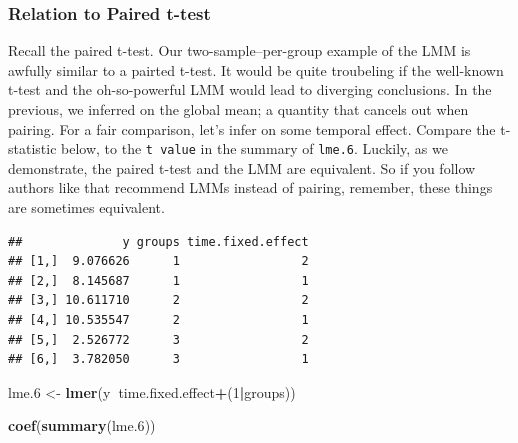 \documentclass[]{book}
\newenvironment{Shaded}{\begin{snugshade}}{\end{snugshade}}
\newcommand{\DataTypeTok}[1]{\textcolor[rgb]{0.13,0.29,0.53}{#1}}
\newcommand{\DecValTok}[1]{\textcolor[rgb]{0.00,0.00,0.81}{#1}}
\newcommand{\FloatTok}[1]{\textcolor[rgb]{0.00,0.00,0.81}{#1}}
\newcommand{\KeywordTok}[1]{\textcolor[rgb]{0.13,0.29,0.53}{\textbf{#1}}}
\newcommand{\NormalTok}[1]{#1}
\newcommand{\OperatorTok}[1]{\textcolor[rgb]{0.81,0.36,0.00}{\textbf{#1}}}
\newcommand{\StringTok}[1]{\textcolor[rgb]{0.31,0.60,0.02}{#1}}
\theoremstyle{definition}
\theoremstyle{definition}
\theoremstyle{definition}
\theoremstyle{remark}
\begin{document}
\hypertarget{relation-to-paired-t-test}{%
\subsubsection{Relation to Paired t-test}\label{relation-to-paired-t-test}}

Recall the paired t-test.
Our two-sample--per-group example of the LMM is awfully similar to a pairted t-test.
It would be quite troubeling if the well-known t-test and the oh-so-powerful LMM would lead to diverging conclusions.
In the previous, we inferred on the global mean; a quantity that cancels out when pairing. For a fair comparison, let's infer on some temporal effect.
Compare the t-statistic below, to the \texttt{t\ value} in the summary of \texttt{lme.6}.
Luckily, as we demonstrate, the paired t-test and the LMM are equivalent.
So if you follow authors like \citet{barr2013random} that recommend LMMs instead of pairing, remember, these things are sometimes equivalent.

\begin{Shaded}
\end{Shaded}

\begin{verbatim}
##              y groups time.fixed.effect
## [1,]  9.076626      1                 2
## [2,]  8.145687      1                 1
## [3,] 10.611710      2                 2
## [4,] 10.535547      2                 1
## [5,]  2.526772      3                 2
## [6,]  3.782050      3                 1
\end{verbatim}

\begin{Shaded}
\begin{Highlighting}[]
\NormalTok{lme}\FloatTok{.6}\NormalTok{ <-}\StringTok{ }\KeywordTok{lmer}\NormalTok{(y}\OperatorTok{~}\NormalTok{time.fixed.effect}\OperatorTok{+}\NormalTok{(}\DecValTok{1}\OperatorTok{|}\NormalTok{groups)) }

\KeywordTok{coef}\NormalTok{(}\KeywordTok{summary}\NormalTok{(lme}\FloatTok{.6}\NormalTok{))}
\end{Highlighting}
\end{Shaded}
\end{document}
